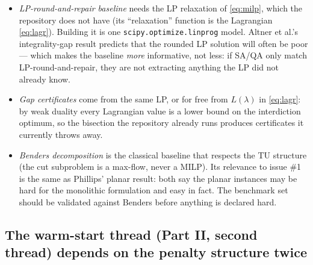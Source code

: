 \documentclass[11pt]{article}
\newcommand{\code}[1]{\texttt{#1}}
\begin{document}
\begin{itemize}[leftmargin=1.5em]
\item \emph{LP-round-and-repair baseline} needs the LP relaxation of \eqref{eq:milp}, which the repository does not have (its ``relaxation'' function is the Lagrangian \eqref{eq:lagr}). Building it is one \code{scipy.optimize.linprog} model. Altner et al.'s integrality-gap result predicts that the rounded LP solution will often be poor --- which makes the baseline \emph{more} informative, not less: if SA/QA only match LP-round-and-repair, they are not extracting anything the LP did not already know.
\item \emph{Gap certificates} come from the same LP, or for free from $L(\lambda)$ in \eqref{eq:lagr}: by weak duality every Lagrangian value is a lower bound on the interdiction optimum, so the bisection the repository already runs produces certificates it currently throws away.
\item \emph{Benders decomposition} is the classical baseline that respects the TU structure (the cut subproblem is a max-flow, never a MILP). Its relevance to issue \#1 is the same as Phillips' planar result: both say the planar instances may be hard for the monolithic formulation and easy in fact. The benchmark set should be validated against Benders before anything is declared hard.
\end{itemize}

\subsection*{The warm-start thread (Part II, second thread) depends on the penalty structure twice}
\end{document}
